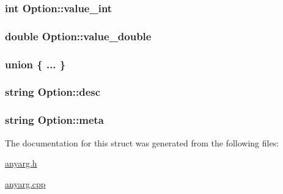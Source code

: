 \subsubsection[{value\+\_\+int}]{\setlength{\rightskip}{0pt plus 5cm}int Option\+::value\+\_\+int}\label{struct_option_a186e1e38cbb463db97e6ac0bd9df2c7f}
\hypertarget{struct_option_a9bb84a8ae8e06721694e5b8fb6a35775}{}
\subsubsection[{value\+\_\+double}]{\setlength{\rightskip}{0pt plus 5cm}double Option\+::value\+\_\+double}\label{struct_option_a9bb84a8ae8e06721694e5b8fb6a35775}
\hypertarget{struct_option_a617516f634d91ac81b7a5d32bf727db9}{}\subsubsection[{"@1}]{\setlength{\rightskip}{0pt plus 5cm}union \{ ... \} }\label{struct_option_a617516f634d91ac81b7a5d32bf727db9}
\hypertarget{struct_option_acead0e0fe56632ced43978c9a09a60db}{}
\subsubsection[{desc}]{\setlength{\rightskip}{0pt plus 5cm}string Option\+::desc}\label{struct_option_acead0e0fe56632ced43978c9a09a60db}
\hypertarget{struct_option_a565dc0f1d839f046c68c12d1b4a6a5fa}{}
\subsubsection[{meta}]{\setlength{\rightskip}{0pt plus 5cm}string Option\+::meta}\label{struct_option_a565dc0f1d839f046c68c12d1b4a6a5fa}


The documentation for this struct was generated from the following files\+:\begin{DoxyCompactItemize}
\item 
\hyperlink{anyarg_8h}{anyarg.\+h}\item 
\hyperlink{anyarg_8cpp}{anyarg.\+cpp}\end{DoxyCompactItemize}
